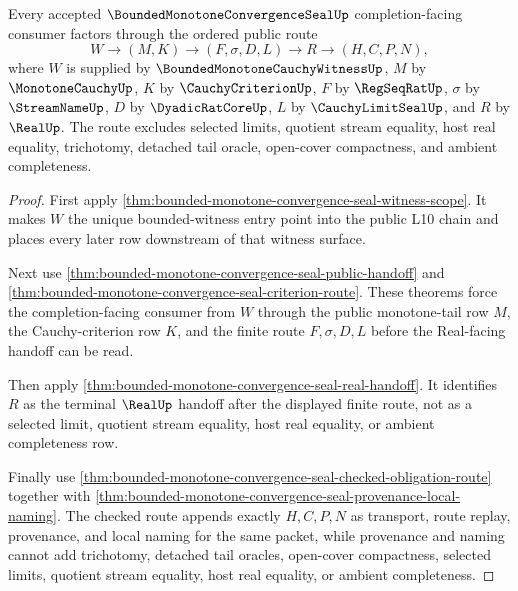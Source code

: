 \begin{theorem}
\label{thm:bounded-monotone-convergence-seal-witness-scope-public-factorization}
Every accepted $\BoundedMonotoneConvergenceSealUp$ completion-facing consumer factors through the ordered public route
$$
W \to (M,K) \to (F,\sigma,D,L) \to R \to (H,C,P,N),
$$
where $W$ is supplied by $\BoundedMonotoneCauchyWitnessUp$, $M$ by $\MonotoneCauchyUp$, $K$ by $\CauchyCriterionUp$, $F$ by $\RegSeqRatUp$, $\sigma$ by $\StreamNameUp$, $D$ by $\DyadicRatCoreUp$, $L$ by $\CauchyLimitSealUp$, and $R$ by $\RealUp$. The route excludes selected limits, quotient stream equality, host real equality, trichotomy, detached tail oracle, open-cover compactness, and ambient completeness.
\end{theorem}
\begin{proof}
First apply \autoref{thm:bounded-monotone-convergence-seal-witness-scope}. It makes $W$ the unique bounded-witness entry point into the public L10 chain and places every later row downstream of that witness surface.

Next use \autoref{thm:bounded-monotone-convergence-seal-public-handoff} and \autoref{thm:bounded-monotone-convergence-seal-criterion-route}. These theorems force the completion-facing consumer from $W$ through the public monotone-tail row $M$, the Cauchy-criterion row $K$, and the finite route $F,\sigma,D,L$ before the Real-facing handoff can be read.

Then apply \autoref{thm:bounded-monotone-convergence-seal-real-handoff}. It identifies $R$ as the terminal $\RealUp$ handoff after the displayed finite route, not as a selected limit, quotient stream equality, host real equality, or ambient completeness row.

Finally use \autoref{thm:bounded-monotone-convergence-seal-checked-obligation-route} together with \autoref{thm:bounded-monotone-convergence-seal-provenance-local-naming}. The checked route appends exactly $H,C,P,N$ as transport, route replay, provenance, and local naming for the same packet, while provenance and naming cannot add trichotomy, detached tail oracles, open-cover compactness, selected limits, quotient stream equality, host real equality, or ambient completeness.
\end{proof}

